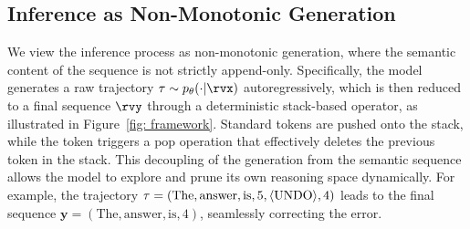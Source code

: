 \subsection{Inference as Non-Monotonic Generation} \label{sec: inference}
We view the inference process as non-monotonic generation, where the semantic content of the sequence is not strictly append-only. 
Specifically, the model generates a raw trajectory $\tau \sim p_\theta(\cdot | \rvx)$ autoregressively, which is then reduced to a final sequence $\rvy$ through a deterministic stack-based operator, as illustrated in Figure~\ref{fig: framework}. 
Standard tokens are pushed onto the stack, while the \bk token triggers a pop operation that effectively deletes the previous token in the stack.
This decoupling of the {generation} from the {semantic sequence} allows the model to explore and prune its own reasoning space dynamically.
For example, the trajectory $\tau = (\text{The}, \text{answer}, \text{is}, 5, \langle\textnormal{UNDO}\rangle, 4)$ leads to the final sequence $\mathbf{y} = (\text{The}, \text{answer}, \text{is}, 4)$, seamlessly correcting the error.



